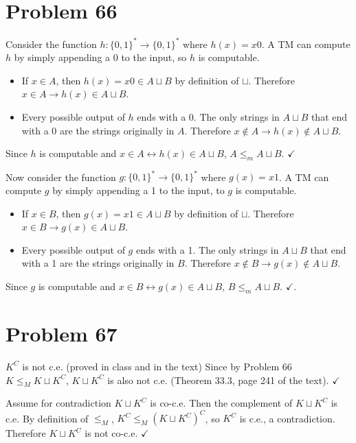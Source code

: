 \documentclass[11pt]{article}
\let\iff\leftrightarrow
\let\imp\rightarrow
\begin{document}
\section*{Problem 66}

Consider the function $h: \{0,1\}^* \imp \{0,1\}^*$ where $h(x) = x0$.
A TM can compute $h$ by simply appending a 0 to the input, so $h$ is computable.
\begin{itemize}
	\item If $x \in A$, then $h(x) = x0 \in A \sqcup B$ by definition of $\sqcup$. 
	Therefore $x \in A \imp h(x) \in A \sqcup B$.
	\item Every possible output of $h$ ends with a 0.
	The only strings in $A \sqcup B$ that end with a 0 are the strings originally in $A$.
	Therefore $ x \notin A \imp h(x) \notin A \sqcup B$.
\end{itemize}

Since $h$ is computable and $x \in A \iff h(x) \in A \sqcup B$, $A \leq _m A \sqcup B$. $\checkmark$

Now consider the function $g: \{0,1\}^* \imp \{0,1\}^*$ where $g(x) = x1$.
A TM can compute $g$ by simply appending a 1 to the input, to $g$ is computable.
\begin{itemize}
	\item If $x \in B$, then $g(x) = x1 \in A \sqcup B$ by definition of $\sqcup$. 
	Therefore $x \in B \imp g(x) \in A \sqcup B$.
	\item Every possible output of $g$ ends with a 1.
	The only strings in $A \sqcup B$ that end with a 1 are the strings originally in $B$.
	Therefore $ x \notin B \imp g(x) \notin A \sqcup B$.
\end{itemize}

Since $g$ is computable and $x \in B \iff g(x) \in A \sqcup B$, $B \leq _m A \sqcup B$. $\checkmark$.


\section*{Problem 67}

$K^C$ is not c.e. (proved in class and in the text)
Since by Problem 66 $K \leq _M K \sqcup K^C$, $K \sqcup K^C$ is also not c.e. (Theorem 33.3, page 241 of the text). $\checkmark$

Assume for contradiction $K \sqcup K^C$ is co-c.e.
Then the complement of $K \sqcup K^C$ is c.e.
By definition of $\leq _M$, $K^C \leq _M (K \sqcup K^C)^C$, so $K^C$ is c.e., a contradiction.
Therefore $K \sqcup K^C$ is not co-c.e. $\checkmark$
\end{document}
